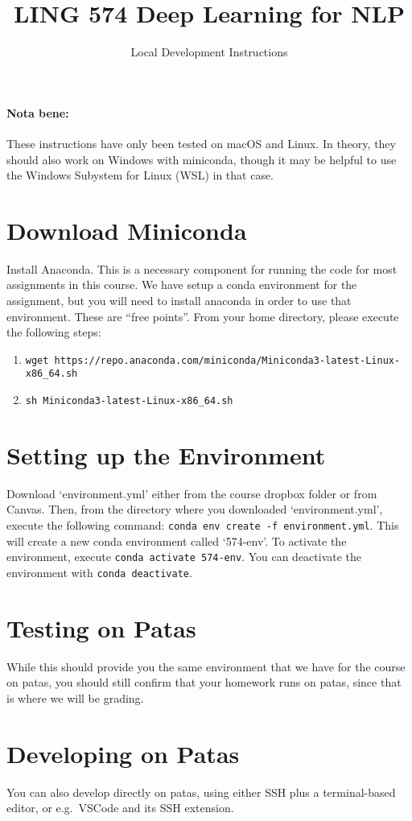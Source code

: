 \documentclass[11pt]{article}
\begin{document}
\title{LING 574 Deep Learning for NLP}
\date{\vspace{-0.2in}Local Development Instructions}
\author{}
\maketitle


\paragraph{Nota bene:} These instructions have only been tested on macOS and Linux.  In theory, they should also work on Windows with miniconda, though it may be helpful to use the Windows Subystem for Linux (WSL) in that case.

\section{Download Miniconda}

Install Anaconda. This is a necessary component for running the code for most assignments in this course.  We have setup a conda environment for the assignment, but you will need to install anaconda in order to use that environment.  These are ``free points''.  From your home directory, please execute the following steps:
\begin{enumerate}
	\item \texttt{wget https://repo.anaconda.com/miniconda/Miniconda3-latest-Linux-x86\_64.sh}
	\item \texttt{sh Miniconda3-latest-Linux-x86\_64.sh}
\end{enumerate}


\section{Setting up the Environment}

Download `environment.yml' either from the course dropbox folder or from Canvas.  Then, from the directory where you downloaded `environment.yml', execute the following command: \texttt{conda env create -f environment.yml}.  This will create a new conda environment called `574-env'.  To activate the environment, execute \texttt{conda activate 574-env}.  You can deactivate the environment with \texttt{conda deactivate}.


\section{Testing on Patas}

While this should provide you the same environment that we have for the course on patas, you should still confirm that your homework runs on patas, since that is where we will be grading.

\section{Developing on Patas}

You can also develop directly on patas, using either SSH plus a terminal-based editor, or e.g.\ VSCode and its SSH extension.
\end{document}
